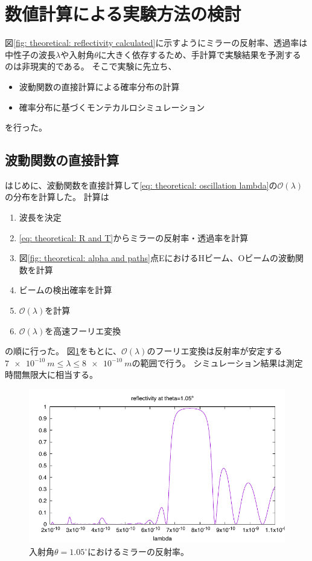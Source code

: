 \documentclass[dvipdfmx]{jsarticle}
\begin{document}
\section{数値計算による実験方法の検討}

図\ref{fig: theoretical: reflectivity calculated}に示すようにミラーの反射率、透過率は中性子の波長$\lambda$や入射角$\theta$に大きく依存するため、手計算で実験結果を予測するのは非現実的である。
そこで実験に先立ち、
\begin{itemize}
    \item 波動関数の直接計算による確率分布の計算
    \item 確率分布に基づくモンテカルロシミュレーション
\end{itemize}
を行った。



\subsection{波動関数の直接計算}
\label{sec: simulate: theoretical}

はじめに、波動関数を直接計算して\eqref{eq: theoretical: oscillation lambda}の$\mathscr{O}(\lambda)$の分布を計算した。
計算は
\begin{enumerate}
    \item 波長を決定
    \item \eqref{eq: theoretical: R and T}からミラーの反射率・透過率を計算
    \item 図\ref{fig: theoretical: alpha and paths}点EにおけるHビーム、Oビームの波動関数を計算
    \item ビームの検出確率を計算
    \item $\mathscr{O}(\lambda)$を計算
    \item $\mathscr{O}(\lambda)$を高速フーリエ変換
\end{enumerate}
の順に行った。
図\ref{fig: simulate: reflectivity at theta 1.05}をもとに、$\mathscr{O}(\lambda)$のフーリエ変換は反射率が安定する$\SI{7e-10}{m}\leq\lambda\leq\SI{8e-10}{m}$の範囲で行う。
シミュレーション結果は測定時間無限大に相当する。

\begin{figure}
    \centering
    \includegraphics[width=0.6\linewidth]{img/reflNiTi-sim2.pdf}
    \caption{入射角$\theta=1.05^\circ$におけるミラーの反射率。}
    \label{fig: simulate: reflectivity at theta 1.05}
\end{figure}
\end{document}
